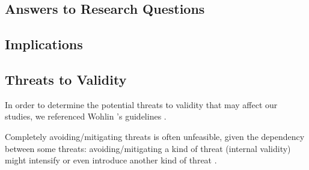 \subsection{Answers to Research Questions}


\subsection{Implications}



\subsection{Threats to Validity}
In order to determine the potential threats to validity that may affect our studies, we referenced Wohlin \etal 's guidelines \cite{DBLP:books/sp/WohlinRHOR00}.

Completely avoiding/mitigating threats is often unfeasible, given the dependency between some threats: avoiding/mitigating a kind of threat (\ie  internal validity) might intensify or even introduce another kind of threat \cite{DBLP:books/sp/WohlinRHOR00}.

